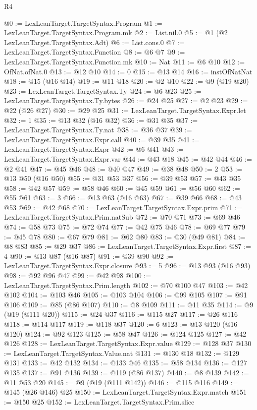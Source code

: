 \begin{lexlean}{R4}
\begin{coremodule}
@0 := LexLeanTarget.TargetSyntax.Program
@1 := LexLeanTarget.TargetSyntax.Program.mk
@2 := List.nil.{0}
@5 := @1 (@2 LexLeanTarget.TargetSyntax.Adt)
@6 := List.cons.{0}
@7 := LexLeanTarget.TargetSyntax.Function
@8 := @6 @7
@9 := LexLeanTarget.TargetSyntax.Function.mk
@10 := Nat
@11 := @6 @10
@12 := OfNat.ofNat.{0}
@13 := @12 @10
@14 := 0
@15 := @13 @14
@16 := instOfNatNat
@18 := @15 (@16 @14)
@19 := @11 @18
@20 := @2 @10
@22 := @9 (@19 @20)
@23 := LexLeanTarget.TargetSyntax.Ty
@24 := @6 @23
@25 := LexLeanTarget.TargetSyntax.Ty.bytes
@26 := @24 @25
@27 := @2 @23
@29 := @22 (@26 @27)
@30 := @29 @25
@31 := LexLeanTarget.TargetSyntax.Expr.let
@32 := 1
@35 := @13 @32 (@16 @32)
@36 := @31 @35
@37 := LexLeanTarget.TargetSyntax.Ty.nat
@38 := @36 @37
@39 := LexLeanTarget.TargetSyntax.Expr.call
@40 := @39 @35
@41 := LexLeanTarget.TargetSyntax.Expr
@42 := @6 @41
@43 := LexLeanTarget.TargetSyntax.Expr.var
@44 := @43 @18
@45 := @42 @44
@46 := @2 @41
@47 := @45 @46
@48 := @40 @47
@49 := @38 @48
@50 := 2
@53 := @13 @50 (@16 @50)
@55 := @31 @53 @37
@56 := @39 @53
@57 := @43 @35
@58 := @42 @57
@59 := @58 @46
@60 := @45 @59
@61 := @56 @60
@62 := @55 @61
@63 := 3
@66 := @13 @63 (@16 @63)
@67 := @39 @66
@68 := @43 @53
@69 := @42 @68
@70 := LexLeanTarget.TargetSyntax.Expr.prim
@71 := LexLeanTarget.TargetSyntax.Prim.natSub
@72 := @70 @71
@73 := @69 @46
@74 := @58 @73
@75 := @72 @74
@77 := @42 @75 @46
@78 := @69 @77
@79 := @45 @78
@80 := @67 @79
@81 := @62 @80
@83 := @30 (@49 @81)
@84 := @8 @83
@85 := @29 @37
@86 := LexLeanTarget.TargetSyntax.Expr.first
@87 := 4
@90 := @13 @87 (@16 @87)
@91 := @39 @90
@92 := LexLeanTarget.TargetSyntax.Expr.closure
@93 := 5
@96 := @13 @93 (@16 @93)
@98 := @92 @96 @47
@99 := @42 @98
@100 := LexLeanTarget.TargetSyntax.Prim.length
@102 := @70 @100 @47
@103 := @42 @102
@104 := @103 @46
@105 := @103 @104
@106 := @99 @105
@107 := @91 @106
@109 := @85 (@86 @107)
@110 := @8 @109
@111 := @11 @35
@114 := @9 (@19 (@111 @20))
@115 := @24 @37
@116 := @115 @27
@117 := @26 @116
@118 := @114 @117
@119 := @118 @37
@120 := 6
@123 := @13 @120 (@16 @120)
@124 := @92 @123
@125 := @58 @47
@126 := @124 @125
@127 := @42 @126
@128 := LexLeanTarget.TargetSyntax.Expr.value
@129 := @128 @37
@130 := LexLeanTarget.TargetSyntax.Value.nat
@131 := @130 @18
@132 := @129 @131
@133 := @42 @132
@134 := @133 @46
@135 := @58 @134
@136 := @127 @135
@137 := @91 @136
@139 := @119 (@86 @137)
@140 := @8 @139
@142 := @11 @53 @20
@145 := @9 (@19 (@111 @142))
@146 := @115 @116
@149 := @145 (@26 @146) @25
@150 := LexLeanTarget.TargetSyntax.Expr.match
@151 := @150 @25
@152 := LexLeanTarget.TargetSyntax.Prim.slice

\end{coremodule}
\end{lexlean}
